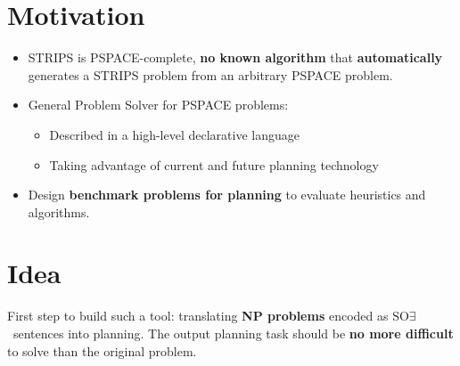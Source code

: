 \documentclass[portrait]{sciposter}
\newcommand{\SOE}{\ensuremath{\text{SO}\exists}}
\begin{document}
\maketitle

\begin{multicols}{2}

%
%

\section*{\large{Motivation}}
\begin{large}
\begin{itemize}
    \item STRIPS is PSPACE-complete, \textbf{no known algorithm}
       that \textbf{automatically} generates a STRIPS problem from an arbitrary
      PSPACE problem. 
    \item General Problem Solver for PSPACE problems:
    \begin{itemize}
        \item Described in a high-level declarative language
        \item Taking advantage of current and future planning technology
    \end{itemize}
    \item Design \textbf{benchmark problems for planning} to evaluate
        heuristics and algorithms.
\end{itemize}
\end{large}

\section*{\large{Idea}}
\begin{large}
    First step to build such a tool: translating \textbf{NP problems}
          encoded as \SOE\ sentences into planning. The output planning task
          should be \textbf{no more difficult} to solve than the original
          problem.\\
\end{large}

\end{multicols}
\end{document}
